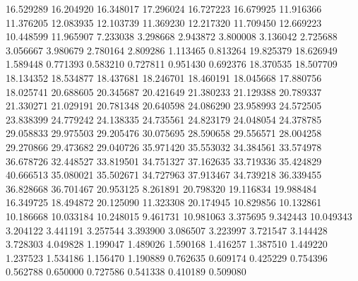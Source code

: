 16.529289
16.204920
16.348017
17.296024
16.727223
16.679925
11.916366
11.376205
12.083935
12.103739
11.369230
12.217320
11.709450
12.669223
10.448599
11.965907
7.233038
3.298668
2.943872
3.800008
3.136042
2.725688
3.056667
3.980679
2.780164
2.809286
1.113465
0.813264
19.825379
18.626949
1.589448
0.771393
0.583210
0.727811
0.951430
0.692376
18.370535
18.507709
18.134352
18.534877
18.437681
18.246701
18.460191
18.045668
17.880756
18.025741
20.688605
20.345687
20.421649
21.380233
21.129388
20.789337
21.330271
21.029191
20.781348
20.640598
24.086290
23.958993
24.572505
23.838399
24.779242
24.138335
24.735561
24.823179
24.048054
24.378785
29.058833
29.975503
29.205476
30.075695
28.590658
29.556571
28.004258
29.270866
29.473682
29.040726
35.971420
35.553032
34.384561
33.574978
36.678726
32.448527
33.819501
34.751327
37.162635
33.719336
35.424829
40.666513
35.080021
35.502671
34.727963
37.913467
34.739218
36.339455
36.828668
36.701467
20.953125
8.261891
20.798320
19.116834
19.988484
16.349725
18.494872
20.125090
11.323308
20.174945
10.829856
10.132861
10.186668
10.033184
10.248015
9.461731
10.981063
3.375695
9.342443
10.049343
3.204122
3.441191
3.257544
3.393900
3.086507
3.223997
3.721547
3.144428
3.728303
4.049828
1.199047
1.489026
1.590168
1.416257
1.387510
1.449220
1.237523
1.534186
1.156470
1.190889
0.762635
0.609174
0.425229
0.754396
0.562788
0.650000
0.727586
0.541338
0.410189
0.509080
